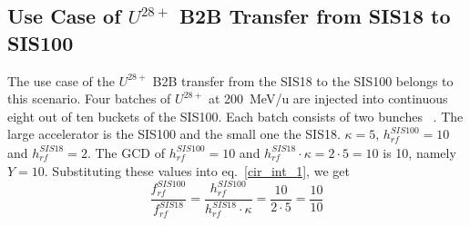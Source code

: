 
\subsection{Use Case of $U^{28+}$ B2B Transfer from SIS18 to SIS100}
\label{sec:cir_no_int}
The use case of the $U^{28+}$ B2B transfer from the SIS18 to the SIS100 belongs to this scenario. Four batches of $U^{28+}$ at \SI{200}{MeV/\atomicmassunit} are injected into continuous eight out of ten buckets of the SIS100. Each batch consists of two bunches ~\cite{liebermann_fair_2013, liebermann_sis100_2013}. The large accelerator is the SIS100 and the small one the SIS18. $\kappa=5$, $h^{\mathit{SIS100}}_\mathit{rf}=10$ and $h^{\mathit{SIS18}}_\mathit{rf}=2$. %
The GCD of $h^{\mathit{SIS100}}_\mathit{rf}=10$ and $h^{\mathit{SIS18}}_\mathit{rf} \cdot \kappa=2\cdot 5=10$ is 10, namely $Y=10$. Substituting these values into eq.~\ref{cir_int_1}, we get
\begin{equation}
\frac{f_{\mathit{rf}}^{\mathit{SIS100}}}{f_{\mathit{rf}}^{\mathit{SIS18}}}= \frac {h^{\mathit{SIS100}}_\mathit{rf}}{h^{\mathit{SIS18}}_\mathit{rf} \cdot \kappa}= \frac{10}{2 \cdot 5}=\frac{10}{10}
\end{equation}


